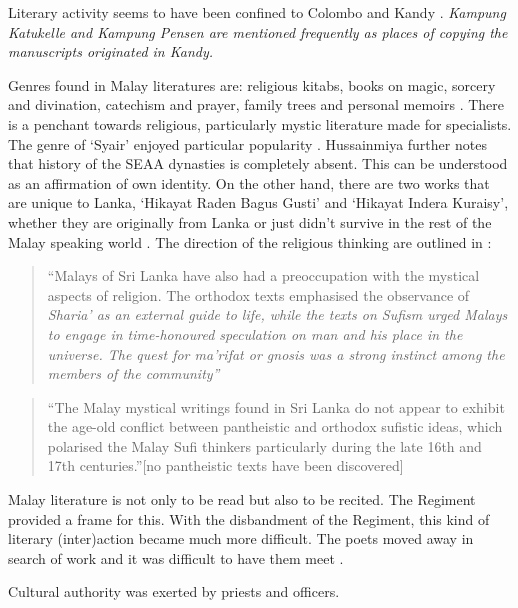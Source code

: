 Literary activity seems to have been confined to Colombo and Kandy \citep[146]{Hussainmiya1990}.  \em Kampung Katukelle \em and \em Kampung Pensen \em are mentioned frequently as places of copying the manuscripts originated in Kandy.

Genres found in Malay literatures are: religious kitabs, books on
magic, sorcery and divination, catechism and prayer, family trees
and personal memoirs \citep[135]{Hussainmiya1990}. There is a
penchant towards religious, particularly mystic literature made
for specialists. The genre of `Syair' enjoyed particular
popularity \citep[140]{Hussainmiya1990}. Hussainmiya further notes
that  history of the SEAA dynasties is completely absent. This can
be understood as an affirmation of own identity. On the other
hand, there are two works that are unique to Lanka, `Hikayat Raden
Bagus Gusti' and `Hikayat Indera Kuraisy', whether they are
originally from Lanka or just didn't survive in the rest of the
Malay speaking world \citep[135f]{Hussainmiya1990}\kuckn. The
direction of the religious thinking are outlined in
\citep[139]{Hussainmiya1990}:


\begin{quote}
   ``Malays of Sri Lanka have also had a preoccupation with the mystical aspects of religion. The orthodox texts emphasised the observance of \em Sharia' \em as an external guide to life, while the texts on Sufism urged Malays to engage in time-honoured speculation on man and his place in the universe. The quest for \em ma'rifat \em or gnosis was a strong instinct among the members of the community''
\end{quote}

\begin{quote}
   ``The Malay mystical writings found in Sri Lanka do not appear to exhibit the age-old conflict between pantheistic and orthodox sufistic ideas, which polarised the Malay Sufi thinkers particularly during the late 16th and 17th centuries.''[no pantheistic texts have been discovered]
\end{quote}

Malay literature is not only to be read but also to be recited. The Regiment provided a frame for this. With the disbandment of the Regiment, this kind of literary (inter)action became much  more difficult. The poets moved away in search of work and it was difficult to have them meet \citep[146]{Hussainmiya1990}.



Cultural authority was exerted by priests and
officers.\citep[138]{Hussainmiya1990}

